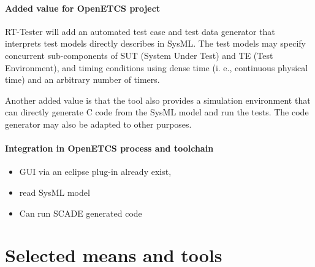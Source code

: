 \paragraph{Added value for OpenETCS project}

RT-Tester will add  an automated test case and test data generator
that interprets test models directly describes in SysML. 
The test models may specify concurrent sub-components of
SUT (System Under Test) and TE (Test Environment), and timing
conditions using dense time (i. e., continuous physical time) and 
an arbitrary number of timers. 

Another added value is that the tool also provides a simulation
environment that can directly generate C code from the SysML model and
run the tests.
The code generator may also be adapted to other purposes.

\paragraph{Integration in OpenETCS process and toolchain}

\begin{itemize}
  \item GUI via an eclipse plug-in already exist,
  \item read SysML model
  \item Can run SCADE generated code
\end{itemize}


\section{Selected means and tools}

\begin{comment}
To complete after decision meeting with a section for each tool with the following contents:

\begin{itemize}
\item description of the means or tools, references and links
\item added value for openETCS
\item for which tasks and how (input/output/actions) is the mean or tools used.
\end{itemize}
\end{comment}